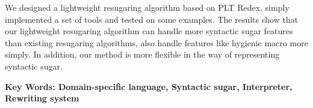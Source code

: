 \documentclass[UTF8,openany,AutoFakeBold,AutoFakeSlant,cs4size]{ctexbook}
\begin{document}
We designed a lightweight resugaring algorithm based on PLT Redex, simply implemented a set of tools and tested on some examples. The results show that our lightweight resugaring algorithm can handle more syntactic sugar features than existing resugaring algorithms, also handle features like hygienic macro more simply. In addition, our method is more flexible in the way of representing syntactic sugar.


\bigskip
\noindent

{\bfseries Key Words: Domain-specific language, Syntactic sugar, Interpreter, Rewriting system }



{
	\fancyhf{}
	\fancyfoot[CO,CE]{~\thepage~}
	\renewcommand{\headrulewidth}{0.7pt}
	\renewcommand{\footrulewidth}{0pt}
}
\fancyhf{}
\fancyfoot[CO,CE]{~\thepage~}
\renewcommand{\headrulewidth}{0.7pt}
\renewcommand{\footrulewidth}{0pt}
\clearpage





{
	\fancyhf{}
	\fancyfoot[CO,CE]{~\thepage~}
	\renewcommand{\headrulewidth}{0.7pt}
	\renewcommand{\footrulewidth}{0pt}
}
\fancyhf{}
\fancyfoot[CO,CE]{~\thepage~}
\renewcommand{\headrulewidth}{0.7pt}
\renewcommand{\footrulewidth}{0pt}
\renewcommand{\contentsname}{\centerline{全文目录}}
\tableofcontents
{}
\clearpage





\normalsize
\linespread{1.5}\selectfont
{
	\fancyhf{}
	\fancyhead[RE,RO]{\leftmark}
	\fancyfoot[CO,CE]{~\thepage~}
	\renewcommand{\headrulewidth}{0.7pt}
	\renewcommand{\footrulewidth}{0pt}
}
\fancyhf{}
\fancyhead[RE,RO]{\leftmark}
\fancyfoot[CO,CE]{~\thepage~}
\renewcommand{\headrulewidth}{0.7pt}
\renewcommand{\footrulewidth}{0pt}









\end{document}
